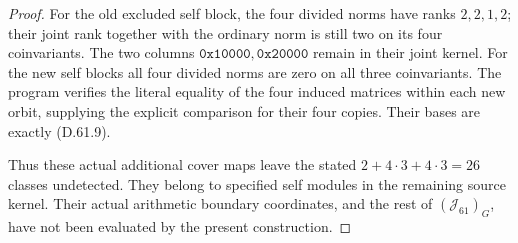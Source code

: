 \begin{proof}
For the old excluded self
block, the four divided norms
have ranks \(2,2,1,2\);
their joint rank together
with the ordinary norm is
still two on its four
coinvariants. The two columns
\(\mathtt{0x10000},\mathtt{0x20000}\)
remain in their joint kernel.
For the new self blocks all
four divided norms are zero
on all three coinvariants.
The program verifies the
literal equality of the four
induced matrices within each
new orbit, supplying the
explicit comparison for their
four copies. Their bases are
exactly (D.61.9).

Thus these actual additional
cover maps leave the stated
\(2+4\cdot3+4\cdot3=26\)
classes undetected. They belong
to specified self modules in
the remaining source kernel.
Their actual arithmetic boundary
coordinates, and the rest of
\((\mathcal J_{61})_G\), have
not been evaluated by the
present construction.
\end{proof}
